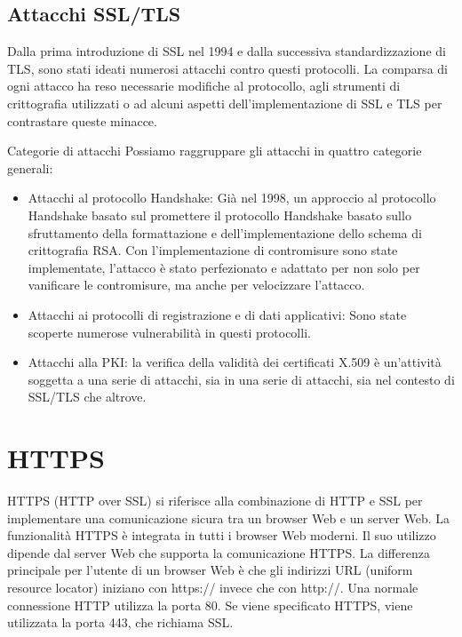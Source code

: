 \newpage

\subsection{Attacchi SSL/TLS}
Dalla prima introduzione di SSL nel 1994 e dalla successiva standardizzazione di TLS, sono stati ideati numerosi attacchi contro questi protocolli. La comparsa di ogni attacco ha reso necessarie modifiche al protocollo, agli strumenti di crittografia utilizzati o ad alcuni aspetti dell'implementazione di SSL e TLS per contrastare queste minacce.

\singlespacing

Categorie di attacchi Possiamo raggruppare gli attacchi in quattro categorie generali:

\begin{itemize}
    \item Attacchi al protocollo Handshake: Già nel 1998, un approccio al protocollo Handshake basato sul promettere il protocollo Handshake basato sullo sfruttamento della formattazione e dell'implementazione dello schema di crittografia RSA. Con l'implementazione di contromisure sono state implementate, l'attacco è stato perfezionato e adattato per non solo per vanificare le contromisure, ma anche per velocizzare l'attacco.
    
    \item Attacchi ai protocolli di registrazione e di dati applicativi: Sono state scoperte numerose vulnerabilità in questi protocolli.
    
    \item Attacchi alla PKI: la verifica della validità dei certificati X.509 è un'attività soggetta a una serie di attacchi, sia in una serie di attacchi, sia nel contesto di SSL/TLS che altrove.
\end{itemize}
\section{HTTPS}
HTTPS (HTTP over SSL) si riferisce alla combinazione di HTTP e SSL per implementare una comunicazione sicura tra un browser Web e un server Web. La funzionalità HTTPS è integrata in tutti i browser Web moderni. Il suo utilizzo dipende dal server Web che supporta la comunicazione HTTPS. La differenza principale per l'utente di un browser Web è che gli indirizzi URL (uniform resource locator) iniziano con https:// invece che con http://. Una normale connessione HTTP
utilizza la porta 80. Se viene specificato HTTPS, viene utilizzata la porta 443, che richiama SSL.

